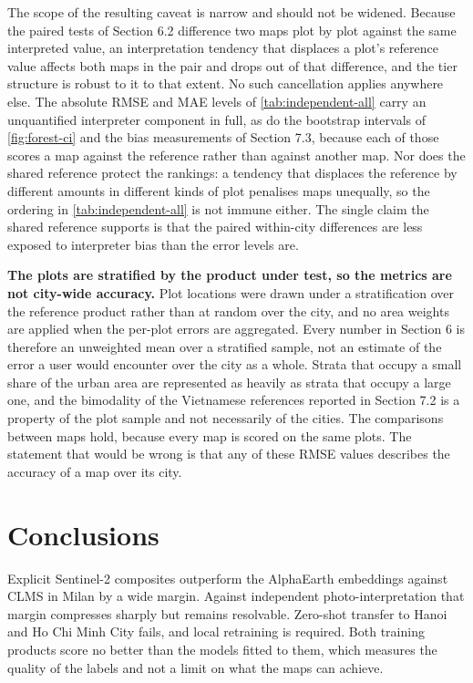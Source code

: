 \documentclass[11pt,a4paper]{article}
\begin{document}
The scope of the resulting caveat is narrow and should not be widened. Because
the paired tests of Section 6.2 difference two maps plot by plot against the
same interpreted value, an interpretation tendency that displaces a plot's
reference value affects both maps in the pair and drops out of that difference,
and the tier structure is robust to it to that extent. No such cancellation
applies anywhere else. The absolute RMSE and MAE levels of
\cref{tab:independent-all} carry an unquantified interpreter component in full,
as do the bootstrap intervals of \cref{fig:forest-ci} and the bias measurements
of Section 7.3, because each of those scores a map against the reference rather
than against another map. Nor does the shared reference protect the rankings: a
tendency that displaces the reference by different amounts in different kinds of
plot penalises maps unequally, so the ordering in \cref{tab:independent-all} is
not immune either. The single claim the shared reference supports is that the
paired within-city differences are less exposed to interpreter bias than the
error levels are.

\textbf{The plots are stratified by the product under test, so the metrics are not
city-wide accuracy.} Plot locations were drawn under a stratification over the
reference product rather than at random over the city, and no area weights are
applied when the per-plot errors are aggregated. Every number in Section 6 is
therefore an unweighted mean over a stratified sample, not an estimate of the
error a user would encounter over the city as a whole. Strata that occupy a
small share of the urban area are represented as heavily as strata that occupy a
large one, and the bimodality of the Vietnamese references reported in Section
7.2 is a property of the plot sample and not necessarily of the cities. The
comparisons between maps hold, because every map is scored on the same plots.
The statement that would be wrong is that any of these RMSE values describes the
accuracy of a map over its city.

\section{Conclusions}

Explicit Sentinel-2 composites outperform the AlphaEarth embeddings against CLMS
in Milan by a wide margin. Against independent photo-interpretation that margin
compresses sharply but remains resolvable. Zero-shot transfer to Hanoi and Ho
Chi Minh City fails, and local retraining is required. Both training products
score no better than the models fitted to them, which measures the quality of
the labels and not a limit on what the maps can achieve.
\end{document}

